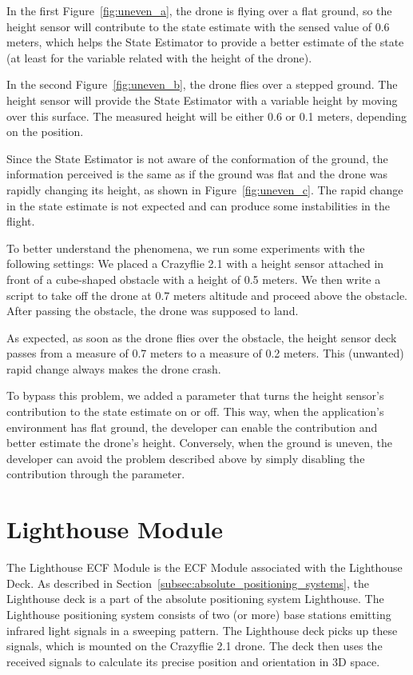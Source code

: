 In the first Figure~\ref{fig:uneven_a}, the drone is flying over a flat ground, so the height sensor will contribute to the state estimate with the sensed value of 0.6 meters, which helps the State Estimator to provide a better estimate of the state (at least for the variable related with the height of the drone).

In the second Figure~\ref{fig:uneven_b}, the drone flies over a stepped ground. 
The height sensor will provide the State Estimator with a variable height by moving over this surface. 
The measured height will be either 0.6 or 0.1 meters, depending on the position.

Since the State Estimator is not aware of the conformation of the ground, the information perceived is the same as if the ground was flat and the drone was rapidly changing its height, as shown in Figure~\ref{fig:uneven_c}. 
The rapid change in the state estimate is not expected and can produce some instabilities in the flight.

To better understand the phenomena, we run some experiments with the following settings:
We placed a Crazyflie 2.1 with a height sensor attached in front of a cube-shaped obstacle with a height of 0.5 meters. 
We then write a script to take off the drone at 0.7 meters altitude and proceed above the obstacle. 
After passing the obstacle, the drone was supposed to land. 

As expected, as soon as the drone flies over the obstacle, the height sensor deck passes from a measure of 0.7 meters to a measure of 0.2 meters. 
This (unwanted) rapid change always makes the drone crash. 

To bypass this problem, we added a parameter that turns the height sensor's contribution to the state estimate on or off.
This way, when the application's environment has flat ground, the developer can enable the contribution and better estimate the drone's height.
Conversely, when the ground is uneven, the developer can avoid the problem described above by simply disabling the contribution through the parameter. 

\section{Lighthouse Module}\label{sec:module_lighthouse}

The Lighthouse ECF Module is the ECF Module associated with the Lighthouse Deck. As described in Section~\ref{subsec:absolute_positioning_systems}, the Lighthouse deck is a part of the absolute positioning system Lighthouse.
The Lighthouse positioning system consists of two (or more) base stations emitting infrared light signals in a sweeping pattern. 
The Lighthouse deck picks up these signals, which is mounted on the Crazyflie 2.1 drone. 
The deck then uses the received signals to calculate its precise position and orientation in 3D space.

